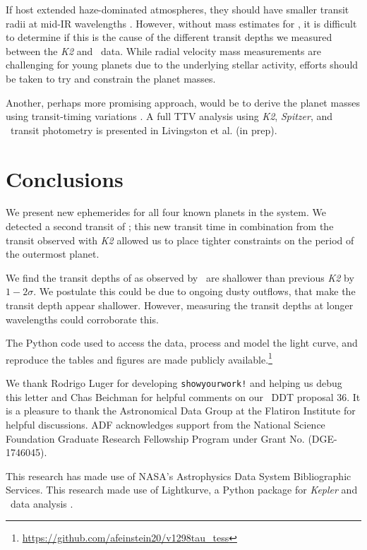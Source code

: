 \documentclass[twocolumn]{aastex631}
\begin{document}
If \allplanets host extended haze-dominated atmospheres, they should have smaller transit radii at mid-IR wavelengths \citep{gao20}. However, without mass estimates for \allplanets, it is difficult to determine if this is the cause of the different transit depths we measured between the \textit{K2} and \tess\ data. While radial velocity mass measurements are challenging for young planets due to the underlying stellar activity, efforts should be taken to try and constrain the planet masses. 

Another, perhaps more promising approach, would be to derive the planet masses using transit-timing variations \citep[TTVs;][]{agol18}. A full TTV analysis using \textit{K2}, \textit{Spitzer}, and \tess\ transit photometry is presented in Livingston et al. (in prep). 

\section{Conclusions} \label{sec:conclusions}

We present new ephemerides for all four known planets in the \sname system. We detected a second transit of \planete; this new transit time in combination from the transit observed with \textit{K2} allowed us to place tighter constraints on the period of the outermost planet.

We find the transit depths of \allplanets as observed by \tess\ are shallower than previous \textit{K2} by $1-2\sigma$. We postulate this could be due to ongoing dusty outflows, that make the transit depth appear shallower. However, measuring the transit depths at longer wavelengths could corroborate this.


The Python code used to access the data, process and model the light curve, and reproduce the tables and figures are made publicly available.\footnote{\url{https://github.com/afeinstein20/v1298tau_tess}}

\begin{acknowledgments}
We thank Rodrigo Luger for developing \texttt{showyourwork!} \citep{luger21} and helping us debug this letter and Chas Beichman for helpful comments on our \tess\ DDT proposal 36. It is a pleasure to thank the Astronomical Data Group at the Flatiron Institute for helpful discussions. ADF acknowledges support from the National Science Foundation Graduate Research Fellowship Program under Grant No. (DGE-1746045).

This research has made use of NASA's Astrophysics Data System Bibliographic Services. This research made use of Lightkurve, a Python package for \textit{Kepler} and \tess\ data analysis \citep{lightkurve}.

\end{acknowledgments}
\end{document}
